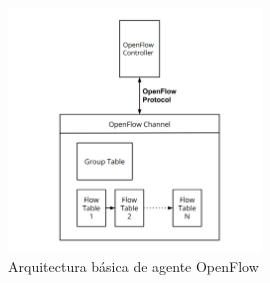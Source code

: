 \begin{figure}[ht]
    \centering
    \includegraphics[width=0.6\textwidth]{archivos/img/teoria/openflow_arch.png}
    \caption{Arquitectura básica de agente OpenFlow \cite{fernandes2015software}}
    \label{fig:openflow_arch}
\end{figure}
